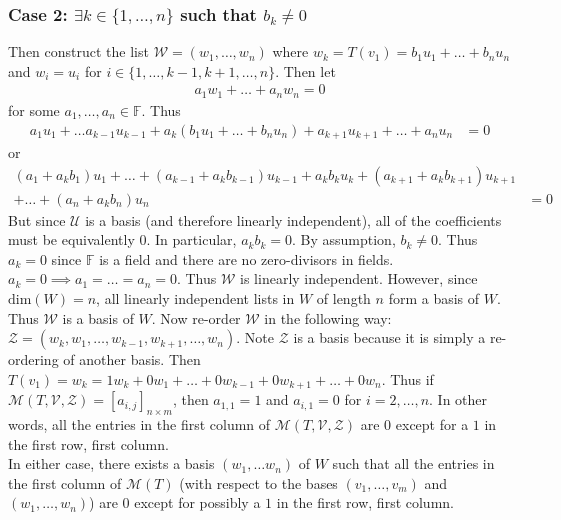 \documentclass[12pt]{article}
\begin{document}
\subsubsection*{Case 2: $\exists k \in \{1, \dots, n\}$ {\rm such that} $b_k \neq 0$}
Then construct the list $\mathcal{W} = (w_1, \dots, w_n)$ where $w_k = T(v_1) = b_1u_1 + \dots + b_nu_n$ and $w_i = u_i$ for $i \in \{1, \dots, k-1, k+1, \dots, n\}$.  Then let
\begin{align*}
a_1w_1 + \dots + a_nw_n = 0
\end{align*}
for some $a_1, \dots, a_n \in \mathbb{F}$.  Thus
\begin{align*}
a_1u_1 + \dots a_{k-1}u_{k-1} + a_k(b_1u_1 + \dots + b_nu_n) + a_{k+1}u_{k+1} + \dots + a_nu_n &= 0
\end{align*}
or
\begin{align*}
(a_1 + a_kb_1)u_1 + \dots + (a_{k-1} + a_kb_{k-1})u_{k-1} + a_kb_ku_k + (a_{k+1} + a_kb_{k+1})u_{k+1}&\\
 + \dots + (a_n + a_kb_n)u_n &= 0
\end{align*}
But since $\mathcal{U}$ is a basis (and therefore linearly independent), all of the coefficients must be equivalently $0$.  In particular, $a_kb_k = 0$.  By assumption, $b_k \neq 0$.  Thus $a_k = 0$ since $\mathbb{F}$ is a field and there are no zero-divisors in fields.  $a_k = 0 \implies a_1 = \dots = a_n = 0$.  Thus $\mathcal{W}$ is linearly independent.  However, since $\text{dim}(W) = n$, all linearly independent lists in $W$ of length $n$ form a basis of $W$.  Thus $\mathcal{W}$ is a basis of $W$.  Now re-order $\mathcal{W}$ in the following way: $\mathcal{Z} = (w_k, w_1, \dots, w_{k-1}, w_{k+1}, \dots, w_n)$.  Note $\mathcal{Z}$ is a basis because it is simply a re-ordering of another basis.  Then $T(v_1) = w_k = 1w_k + 0w_1 + \dots + 0w_{k-1} + 0w_{k+1} + \dots + 0w_n$.  Thus if $\mathcal{M}(T, \mathcal{V}, \mathcal{Z}) = [a_{i,j}]_{n\times m}$, then $a_{1,1} = 1$ and $a_{i,1} = 0$ for $i = 2, \dots, n$.  In other words, all the entries in the first column of $\mathcal{M}(T, \mathcal{V}, \mathcal{Z})$ are $0$ except for a $1$ in the first row, first column. \\

\noindent In either case, there exists a basis $(w_1, \dots w_n)$ of $W$ such that all the entries in the first column of $\mathcal{M}(T)$ (with respect to the bases $(v_1, \dots, v_m)$ and $(w_1, \dots, w_n)$) are $0$ except for possibly a $1$ in the first row, first column. \qedsymbol
\end{document}
